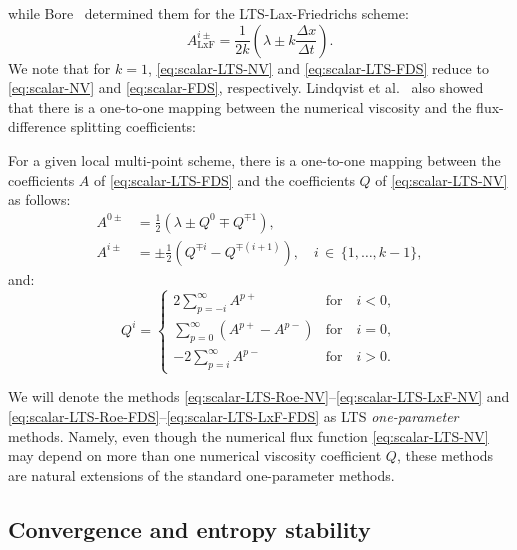 while Bore~\cite{bor15} determined them for the LTS-Lax-Friedrichs scheme:
\begin{equation} \label{eq:scalar-LTS-LxF-FDS}
A_{\text{LxF}}^{i\pm} = \frac{1}{2 k} \left( \lambda \pm k \frac{\Delta x}{\Delta t} \right).
\end{equation}
We note that for $ k=1 $, \eqref{eq:scalar-LTS-NV} and \eqref{eq:scalar-LTS-FDS} reduce to \eqref{eq:scalar-NV} and \eqref{eq:scalar-FDS}, respectively. Lindqvist et al.~\cite{lin16} also showed that there is a one-to-one mapping between the numerical viscosity and the flux-difference splitting coefficients:
\begin{lemma}
For a given local multi-point scheme, there is a one-to-one mapping between the coefficients $ A $ of \eqref{eq:scalar-LTS-FDS} and the coefficients $ Q $ of \eqref{eq:scalar-LTS-NV} as follows:
\begin{subequations} \label{eq:NV-FDS}
\begin{align}
A^{0\pm} & = \frac{1}{2} \left( \lambda \pm Q^0 \mp Q^{\mp 1} \right), \\
A^{i\pm} & = \pm \frac{1}{2} \left( Q^{\mp i} - Q^{\mp (i+1)}\right), \quad i \, \in \, \{1,\dots,k-1\},
\end{align}
\end{subequations}
and:
\begin{equation} \label{eq:FDS-NV}
Q^i = \left\{ \begin{array}{lll}
2 \sum_{p=-i}^{\infty}			A^{p+} \qquad \quad & \text{for} \quad i<0, \\[0.25em]
  \sum_{p=0} ^{\infty} \left( A^{p+} - A^{p-} \right) & \text{for} \quad i=0, \\[0.25em]
-2 \sum_{p=i} ^{\infty} 		A^{p-} \quad & \text{for} \quad i>0. \end{array} \right.
\end{equation}
\end{lemma}

We will denote the methods \eqref{eq:scalar-LTS-Roe-NV}--\eqref{eq:scalar-LTS-LxF-NV} and \eqref{eq:scalar-LTS-Roe-FDS}--\eqref{eq:scalar-LTS-LxF-FDS} as LTS \textit{one-parameter} methods. Namely, even though the numerical flux function \eqref{eq:scalar-LTS-NV} may depend on more than one numerical viscosity coefficient $ Q $, these methods are natural extensions of the standard one-parameter methods.

\subsection{Convergence and entropy stability}
\label{sec:Background:C-ES-scalar-LTS}

